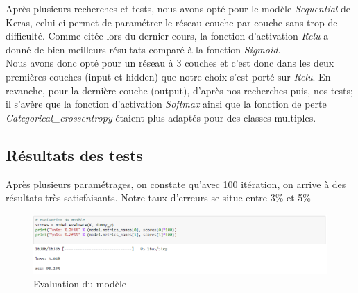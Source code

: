 \documentclass[11pt]{article}
\begin{document}
Après plusieurs recherches et tests, nous avons opté pour le modèle \textit{Sequential} de Keras, celui ci permet de paramétrer le réseau couche par couche sans trop de difficulté. \newline \newline
Comme citée lors du dernier cours, la fonction d'activation \textit{Relu} a donné de bien meilleurs résultats comparé à la fonction \textit{Sigmoid}.\\ Nous avons donc opté pour un réseau à 3 couches et c'est donc dans les deux premières couches (input et hidden) que notre choix s'est porté sur \textit{Relu}. \newline \newline
En revanche, pour la dernière couche (output), d'après nos recherches puis, nos tests; il s'avère que la fonction d'activation \textit{Softmax} ainsi que la fonction de perte \textit{Categorical\_crossentropy} étaient plus adaptés pour des classes multiples. \newline


\subsection{Résultats des tests}


Après plusieurs paramétrages, on constate qu'avec 100 itération, on arrive à des résultats très satisfaisants. Notre taux d'erreurs se situe entre 3\% et 5\% \newline \newline

\begin{figure}[!htb]
  \centering
    \caption{Evaluation du modèle}
    \includegraphics[width=\textwidth]{loss.png}
    \end{figure}
    
\end{document}
